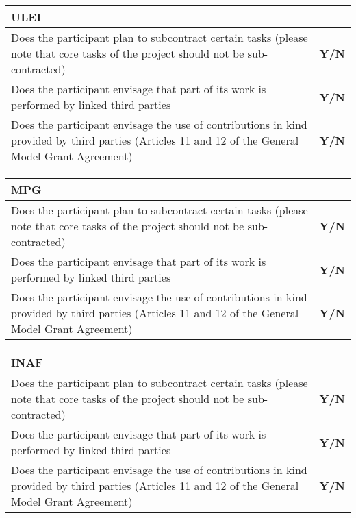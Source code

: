 
\begin{tabular}{|p{}|p{}|}
  \hline  
  \multicolumn{2}{|l|}{\cellcolor[gray]{0.8}\textbf{ULEI}}\\
  \hline
  Does the participant plan to subcontract certain tasks (please note that core tasks of the project should not be sub-contracted) &
  \textbf{Y/N} \\
  \hline
Does the participant envisage that part of its work is performed by linked
third parties &
  \textbf{Y/N} \\
  \hline
  Does the participant envisage the use of contributions in kind provided by
third parties (Articles 11 and 12 of the General Model Grant Agreement) &
  \textbf{Y/N}\\
  \hline
\end{tabular}

\begin{tabular}{|p{}|p{}|}
  \hline  
  \multicolumn{2}{|l|}{\cellcolor[gray]{0.8}\textbf{MPG}}\\
  \hline
  Does the participant plan to subcontract certain tasks (please note that core tasks of the project should not be sub-contracted) &
  \textbf{Y/N} \\
  \hline
Does the participant envisage that part of its work is performed by linked
third parties &
  \textbf{Y/N} \\
  \hline
  Does the participant envisage the use of contributions in kind provided by
third parties (Articles 11 and 12 of the General Model Grant Agreement) &
  \textbf{Y/N}\\
  \hline
\end{tabular}

\begin{tabular}{|p{}|p{}|}
  \hline  
  \multicolumn{2}{|l|}{\cellcolor[gray]{0.8}\textbf{INAF}}\\
  \hline
  Does the participant plan to subcontract certain tasks (please note that core tasks of the project should not be sub-contracted) &
  \textbf{Y/N} \\
  \hline
Does the participant envisage that part of its work is performed by linked
third parties &
  \textbf{Y/N} \\
  \hline
  Does the participant envisage the use of contributions in kind provided by
third parties (Articles 11 and 12 of the General Model Grant Agreement) &
  \textbf{Y/N}\\
  \hline
\end{tabular}

